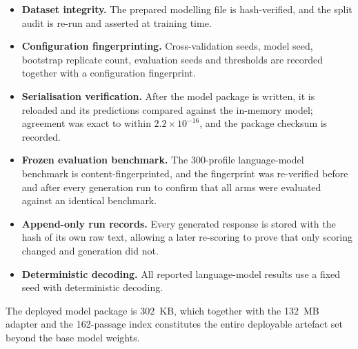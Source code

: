 \begin{itemize}
  \item \textbf{Dataset integrity.} The prepared modelling file is
        hash-verified, and the split audit is re-run and asserted at training
        time.
  \item \textbf{Configuration fingerprinting.} Cross-validation seeds, model
        seed, bootstrap replicate count, evaluation seeds and thresholds are
        recorded together with a configuration fingerprint.
  \item \textbf{Serialisation verification.} After the model package is written,
        it is reloaded and its predictions compared against the in-memory model;
        agreement was exact to within $2.2\times10^{-16}$, and the package
        checksum is recorded.
  \item \textbf{Frozen evaluation benchmark.} The 300-profile language-model
        benchmark is content-fingerprinted, and the fingerprint was re-verified
        before and after every generation run to confirm that all arms were
        evaluated against an identical benchmark.
  \item \textbf{Append-only run records.} Every generated response is stored
        with the hash of its own raw text, allowing a later re-scoring to prove
        that only scoring changed and generation did not.
  \item \textbf{Deterministic decoding.} All reported language-model results use
        a fixed seed with deterministic decoding.
\end{itemize}

The deployed model package is 302~KB, which together with the 132~MB adapter and
the 162-passage index constitutes the entire deployable artefact set beyond the
base model weights.
